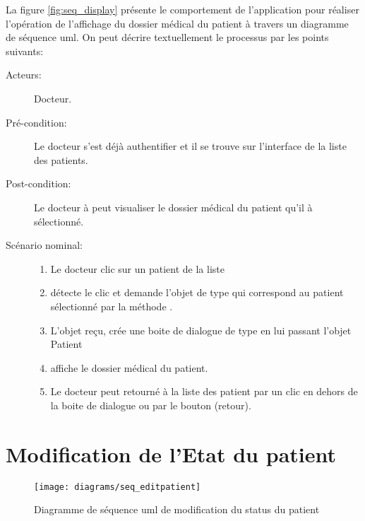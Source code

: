 La figure \ref{fig:seq_display} présente le comportement de l'application pour réaliser l'opération de l'affichage du dossier médical du patient à travers un diagramme de séquence \gls{uml}. On peut décrire textuellement le processus par les points suivants:

\begin{description}

\item[Acteurs:] Docteur.

\item[Pré-condition:] Le docteur s'est déjà authentifier et il se trouve sur l'interface de la liste des patients.

\item[Post-condition:] Le docteur à peut visualiser le dossier médical du patient qu'il à sélectionné.

\item[Scénario nominal:]

\begin{enumerate}

\item Le docteur clic sur un patient de la liste

\item {} détecte le clic et demande l'objet de type  qui correspond au patient sélectionné par la méthode .

\item L'objet  reçu,  crée une boite de  dialogue de type  en lui passant l'objet Patient

\item {} affiche le dossier médical du patient.

\item Le docteur peut retourné à la liste des patient par un clic en dehors de la boite de dialogue ou par le bouton (retour).

\end{enumerate}

\end{description}

\section{Modification de l'Etat du patient}

\begin{figure}
\center
\texttt{[image: diagrams/seq\_editpatient]}
\caption{Diagramme de séquence \gls{uml} de modification du status du patient}
\label{fig:seq_edit}
\end{figure}

